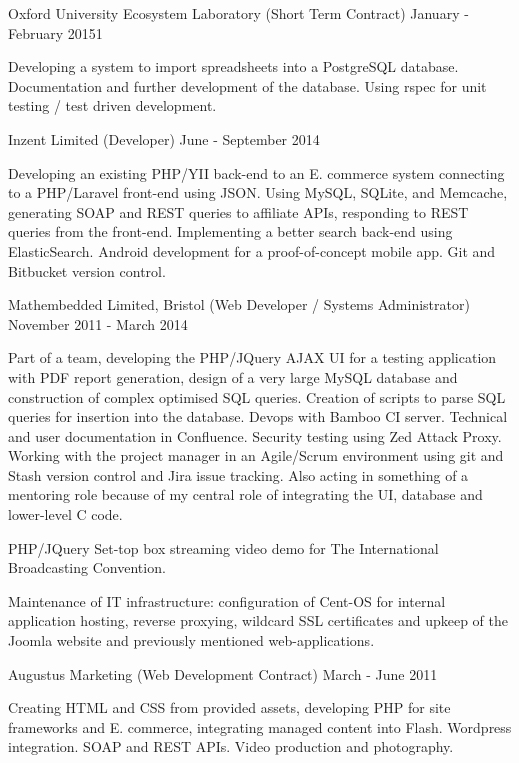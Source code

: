 \jobHeading
    {Oxford University Ecosystem Laboratory (Short Term Contract)}
    {January - February 20151}

Developing a 
system to import spreadsheets into a PostgreSQL database.
Documentation and further development of the database.
Using rspec for unit testing / test driven development.

\jobHeading
    {Inzent Limited (Developer)}
    {June - September 2014}

Developing an existing PHP/YII back-end to an
E. commerce system connecting to a PHP/Laravel front-end using JSON.
Using MySQL, SQLite, and Memcache,
generating SOAP and REST queries to affiliate APIs,
responding to REST queries from the front-end.
Implementing a better search back-end using ElasticSearch.
Android development for a proof-of-concept mobile app.
Git and Bitbucket version control.

\jobHeading
    {Mathembedded Limited, Bristol (Web Developer / Systems Administrator)}
    {November 2011 - March 2014}

Part of a team, developing the PHP/JQuery AJAX UI
for a testing application with PDF report generation,
design of a very large MySQL database
and construction of complex optimised SQL queries.
Creation of  scripts
to parse SQL queries for insertion into the database.
Devops with Bamboo CI server.
Technical and user documentation in Confluence.
Security testing using Zed Attack Proxy.
Working with the project manager in an Agile/Scrum environment
using git and Stash version control and Jira issue tracking.
Also acting in something of a mentoring role
because of my central role of integrating the UI,
database and lower-level C code.

PHP/JQuery Set-top box streaming video demo for
The International Broadcasting Convention.

Maintenance of IT infrastructure:
configuration of Cent-OS for internal application hosting,
reverse proxying, wildcard SSL certificates
and upkeep of the Joomla website
and previously mentioned web-applications.

\jobHeading
    {Augustus Marketing (Web Development Contract)}
    {March - June 2011}

Creating HTML and CSS from provided assets,
developing PHP for site frameworks and E. commerce,
integrating managed content into Flash.
Wordpress integration.
SOAP and REST APIs.
Video production and photography.

